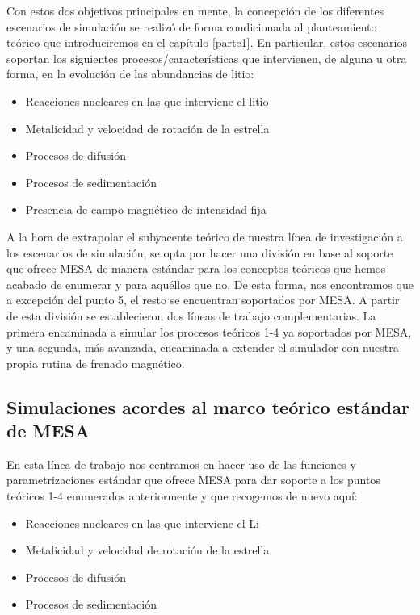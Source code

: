 Con estos dos objetivos principales en mente, la concepción de los diferentes escenarios de simulación se realizó de forma condicionada al planteamiento teórico que introduciremos en el capítulo \ref{parte1}. En particular, estos escenarios soportan los siguientes procesos/características que intervienen, de alguna u otra forma, en la evolución de las abundancias de litio:

\begin{itemize}
    \item Reacciones nucleares en las que interviene el litio
    \item Metalicidad y velocidad de rotación de la estrella
    \item Procesos de difusión
    \item Procesos de sedimentación
    \item Presencia de campo magnético de intensidad fija
\end{itemize}

A la hora de extrapolar el subyacente teórico de nuestra línea de investigación a los escenarios de simulación, se opta por hacer una división en base al soporte que ofrece MESA de manera estándar para los conceptos teóricos que hemos acabado de enumerar y para aquéllos que no. De esta forma, nos encontramos que a excepción del punto 5, el resto se encuentran soportados por MESA. A partir de esta división se establecieron dos líneas de trabajo complementarias. La primera encaminada a simular los procesos teóricos 1-4 ya soportados por MESA, y una segunda, más avanzada, encaminada a extender el simulador con nuestra propia rutina de frenado magnético.\par

\subsection{Simulaciones acordes al marco teórico estándar de MESA}
En esta línea de trabajo nos centramos en hacer uso de las funciones y parametrizaciones estándar que ofrece MESA para dar soporte a los puntos teóricos 1-4 enumerados anteriormente y que recogemos de nuevo aquí:

\begin{itemize}
    \item Reacciones nucleares en las que interviene el Li
    \item Metalicidad y velocidad de rotación de la estrella
    \item Procesos de difusión
    \item Procesos de sedimentación
\end{itemize}

